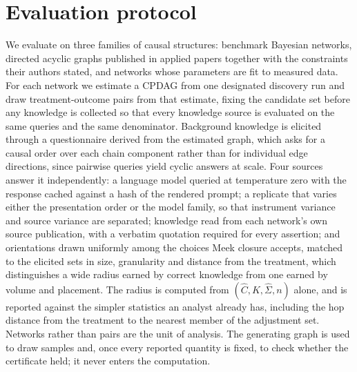 
\section{Evaluation protocol}
\label{sec:protocol}

We evaluate on three families of causal structures: benchmark Bayesian networks, directed acyclic
graphs published in applied papers together with the constraints their authors stated, and networks
whose parameters are fit to measured data. For each network we estimate a CPDAG from one designated
discovery run and draw treatment-outcome pairs from that estimate, fixing the candidate set before
any knowledge is collected so that every knowledge source is evaluated on the same queries and the
same denominator. Background knowledge is elicited through a questionnaire derived from the
estimated graph, which asks for a causal order over each chain component rather than for individual
edge directions, since pairwise queries yield cyclic answers at scale. Four sources answer it
independently: a language model queried at temperature zero with the response cached against a hash
of the rendered prompt; a replicate that varies either the presentation order or the model family,
so that instrument variance and source variance are separated; knowledge read from each network's
own source publication, with a verbatim quotation required for every assertion; and orientations
drawn uniformly among the choices Meek closure accepts, matched to the elicited sets in size,
granularity and distance from the treatment, which distinguishes a wide radius earned by correct
knowledge from one earned by volume and placement. The radius is computed from
$(\widehat{C}, K, \widehat{\Sigma}, n)$ alone, and is reported against the simpler statistics an
analyst already has, including the hop distance from the treatment to the nearest member of the
adjustment set. Networks rather than pairs are the unit of analysis. The generating graph is used to
draw samples and, once every reported quantity is fixed, to check whether the certificate held; it
never enters the computation.
